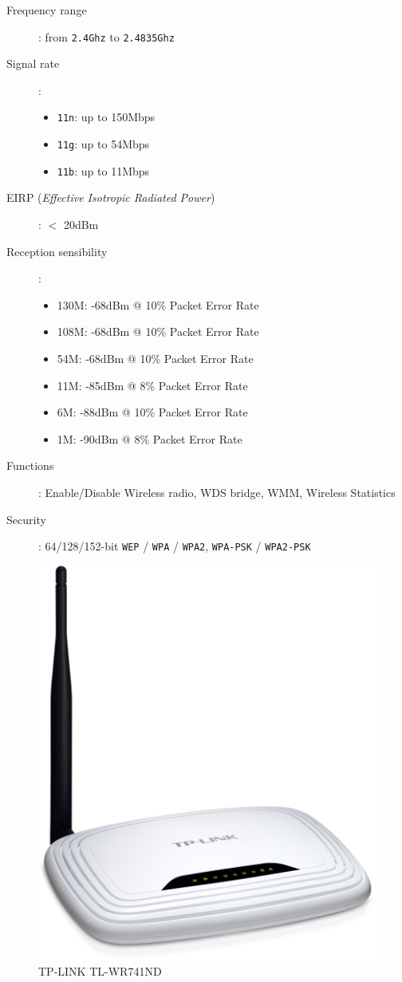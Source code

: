 \begin{description}
	\item [Frequency range]: from \texttt{2.4Ghz} to \texttt{2.4835Ghz}
	\item [Signal rate]:
		\begin{itemize}
			\item \texttt{11n}: up to 150Mbps
			\item \texttt{11g}: up to 54Mbps
			\item \texttt{11b}: up to 11Mbps
		\end{itemize}
	\item [EIRP (\textit{Effective Isotropic Radiated Power})]: $<$ 20dBm 
	\item [Reception sensibility]:
		\begin{itemize}
			\item 130M: -68dBm @ 10\% Packet Error Rate
			\item 108M: -68dBm @ 10\% Packet Error Rate
			\item 54M: -68dBm @ 10\% Packet Error Rate
			\item 11M: -85dBm @ 8\% Packet Error Rate
			\item 6M: -88dBm @ 10\% Packet Error Rate
			\item 1M: -90dBm @ 8\% Packet Error Rate
		\end{itemize}
	\item [Functions]: Enable/Disable Wireless radio, WDS bridge, WMM, Wireless Statistics
	\item [Security]: 64/128/152-bit \texttt{WEP} / \texttt{WPA} / \texttt{WPA2}, \texttt{WPA-PSK} / \texttt{WPA2-PSK}
\end{description}
\begin{figure}[H]
	\begin{center}
		\includegraphics[width=0.26\linewidth]{Pictures/chapter4/router.jpg}
		\caption{TP-LINK TL-WR741ND}
	\end{center}
\end{figure}

